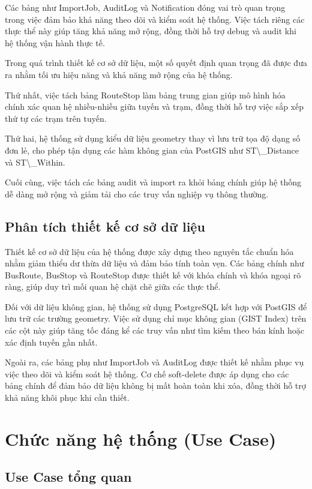\documentclass[13pt,a4paper]{report}
\begin{document}
Các bảng như ImportJob, AuditLog và Notification đóng vai trò quan trọng trong việc đảm bảo khả năng theo dõi và kiểm soát hệ thống. Việc tách riêng các thực thể này giúp tăng khả năng mở rộng, đồng thời hỗ trợ debug và audit khi hệ thống vận hành thực tế.

Trong quá trình thiết kế cơ sở dữ liệu, một số quyết định quan trọng đã được đưa ra nhằm tối ưu hiệu năng và khả năng mở rộng của hệ thống.

Thứ nhất, việc tách bảng RouteStop làm bảng trung gian giúp mô hình hóa chính xác quan hệ nhiều-nhiều giữa tuyến và trạm, đồng thời hỗ trợ việc sắp xếp thứ tự các trạm trên tuyến.

Thứ hai, hệ thống sử dụng kiểu dữ liệu geometry thay vì lưu trữ tọa độ dạng số đơn lẻ, cho phép tận dụng các hàm không gian của PostGIS như ST\textbackslash{}_Distance và ST\textbackslash{}_Within.

Cuối cùng, việc tách các bảng audit và import ra khỏi bảng chính giúp hệ thống dễ dàng mở rộng và giảm tải cho các truy vấn nghiệp vụ thông thường.

\subsection{Phân tích thiết kế cơ sở dữ liệu}

Thiết kế cơ sở dữ liệu của hệ thống được xây dựng theo nguyên tắc chuẩn hóa nhằm giảm thiểu dư thừa dữ liệu và đảm bảo tính toàn vẹn. Các bảng chính như BusRoute, BusStop và RouteStop được thiết kế với khóa chính và khóa ngoại rõ ràng, giúp duy trì mối quan hệ chặt chẽ giữa các thực thể.

Đối với dữ liệu không gian, hệ thống sử dụng PostgreSQL kết hợp với PostGIS để lưu trữ các trường geometry. Việc sử dụng chỉ mục không gian (GIST Index) trên các cột này giúp tăng tốc đáng kể các truy vấn như tìm kiếm theo bán kính hoặc xác định tuyến gần nhất.

Ngoài ra, các bảng phụ như ImportJob và AuditLog được thiết kế nhằm phục vụ việc theo dõi và kiểm soát hệ thống. Cơ chế soft-delete được áp dụng cho các bảng chính để đảm bảo dữ liệu không bị mất hoàn toàn khi xóa, đồng thời hỗ trợ khả năng khôi phục khi cần thiết.

\section{Chức năng hệ thống (Use Case)}

\subsection{Use Case tổng quan}
\end{document}
